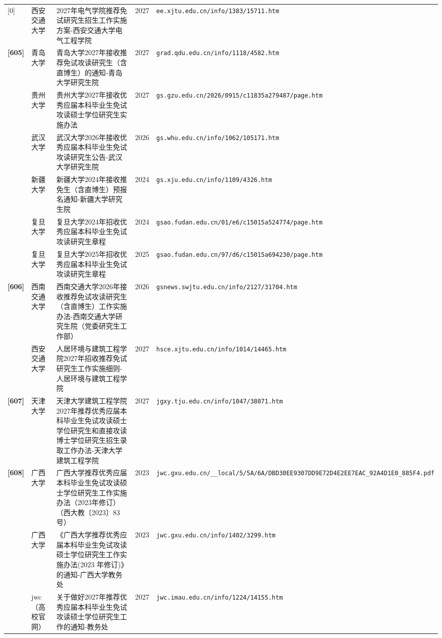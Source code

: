 {\begin{longtable}{@{}p{1.15cm}p{2.9cm}p{6.3cm}p{0.85cm}p{5.0cm}@{}}
[0] & 西安交通大学 & 2027年电气学院推荐免试研究生招生工作实施方案-西安交通大学电气工程学院 & 2027 & \texttt{ee.xjtu.edu.cn/info/1383/15711.htm} \\
\textbf{[605]} & 青岛大学 & 青岛大学2027年接收推荐免试攻读研究生（含直博生）的通知-青岛大学研究生院 & 2027 & \texttt{grad.qdu.edu.cn/info/1118/4582.htm} \\
[0] & 贵州大学 & 贵州大学2027年接收优秀应届本科毕业生免试攻读硕士学位研究生实施办法 & 2027 & \texttt{gs.gzu.edu.cn/2026/0915/c11835a279487/page.htm} \\
[0] & 武汉大学 & 武汉大学2026年接收优秀应届本科毕业生免试攻读研究生公告-武汉大学研究生院 & 2026 & \texttt{gs.whu.edu.cn/info/1062/105171.htm} \\
[0] & 新疆大学 & 新疆大学2024年接收推免生（含直博生）预报名通知-新疆大学研究生院 & 2024 & \texttt{gs.xju.edu.cn/info/1109/4326.htm} \\
[0] & 复旦大学 & 复旦大学2024年招收优秀应届本科毕业生免试攻读研究生章程 & 2024 & \texttt{gsao.fudan.edu.cn/01/e6/c15015a524774/page.htm} \\
[0] & 复旦大学 & 复旦大学2025年招收优秀应届本科毕业生免试攻读研究生章程 & 2025 & \texttt{gsao.fudan.edu.cn/97/d6/c15015a694230/page.htm} \\
\textbf{[606]} & 西南交通大学 & 西南交通大学2026年接收推荐免试攻读研究生（含直博生）工作实施办法-西南交通大学研究生院（党委研究生工作部） & 2026 & \texttt{gsnews.swjtu.edu.cn/info/2127/31704.htm} \\
[0] & 西安交通大学 & 人居环境与建筑工程学院2027年招收推荐免试研究生工作实施细则-人居环境与建筑工程学院 & 2027 & \texttt{hsce.xjtu.edu.cn/info/1014/14465.htm} \\
\textbf{[607]} & 天津大学 & 天津大学建筑工程学院2027年推荐优秀应届本科毕业生免试攻读硕士学位研究生和直接攻读博士学位研究生招生录取工作办法-天津大学建筑工程学院 & 2027 & \texttt{jgxy.tju.edu.cn/info/1047/38071.htm} \\
\textbf{[608]} & 广西大学 & 广西大学推荐优秀应届本科毕业生免试攻读硕士学位研究生工作实施办法（2023年修订）（西大教〔2023〕83号） & 2023 & \texttt{jwc.gxu.edu.cn/\_\_local/5/5A/6A/DBD30EE9307DD9E72D4E2EE7EAC\_92A4D1E0\_885F4.pdf} \\
[0] & 广西大学 & 《广西大学推荐优秀应届本科毕业生免试攻读硕士学位研究生工作实施办法(2023 年修订)》的通知-广西大学教务处 & 2023 & \texttt{jwc.gxu.edu.cn/info/1402/3299.htm} \\
[0] & jwc（高校官网） & 关于做好2027年推荐优秀应届本科毕业生免试攻读硕士学位研究生工作的通知-教务处 & 2027 & \texttt{jwc.imau.edu.cn/info/1224/14155.htm} \\

\end{longtable}}
